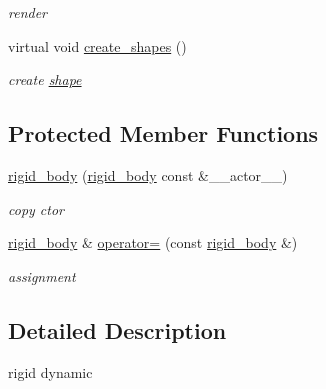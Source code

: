 \begin{DoxyCompactItemize}
\begin{DoxyCompactList}\small\item\em render \item\end{DoxyCompactList}\item 
virtual void \hyperlink{classnebula_1_1content_1_1actor_1_1admin_1_1rigid__body_a649883f2e1d157c2b94cc475f458a3c4}{create\_\-shapes} ()
\begin{DoxyCompactList}\small\item\em create \hyperlink{namespacenebula_1_1content_1_1shape}{shape} \item\end{DoxyCompactList}\end{DoxyCompactItemize}
\subsection*{Protected Member Functions}
\begin{DoxyCompactItemize}
\item 
\hyperlink{classnebula_1_1content_1_1actor_1_1admin_1_1rigid__body_afca06591212ce2a515272f65d4572586}{rigid\_\-body} (\hyperlink{classnebula_1_1content_1_1actor_1_1admin_1_1rigid__body}{rigid\_\-body} const \&\_\-\_\-actor\_\-\_\-)
\begin{DoxyCompactList}\small\item\em copy ctor \item\end{DoxyCompactList}\item 
\hyperlink{classnebula_1_1content_1_1actor_1_1admin_1_1rigid__body}{rigid\_\-body} \& \hyperlink{classnebula_1_1content_1_1actor_1_1admin_1_1rigid__body_a7ed8ba2a35fdf83cf508fe37fde0d875}{operator=} (const \hyperlink{classnebula_1_1content_1_1actor_1_1admin_1_1rigid__body}{rigid\_\-body} \&)
\begin{DoxyCompactList}\small\item\em assignment \item\end{DoxyCompactList}\end{DoxyCompactItemize}


\subsection{Detailed Description}
rigid dynamic 

